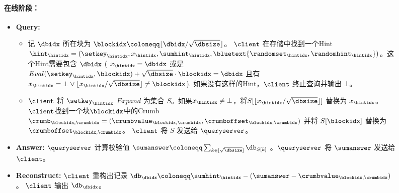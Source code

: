 \begin{figure*}
\begin{mdframed}
        \paragraph{在线阶段：}
        \begin{itemize}
            \item \textbf{Query:}
                  \begin{itemize}
                      \item 记 $\dbidx$ 所在块为 $\blockidx\coloneqq \lfloor \dbidx/\sqrt{\dbsize}\rfloor$。  $\client$ 在存储中找到一个Hint $\hint_\hintidx = (\setkey_\hintidx,x_\hintidx,\sumhint_\hintidx,\bluetext{\randomset_\hintidx,\randomhint_\hintidx})$。这个Hint需要包含 $\dbidx$ ( $x_\hintidx=\dbidx$ 或是 $Eval(\setkey_\hintidx, \blockidx) + \sqrt{\dbsize}\cdot \blockidx = \dbidx $ 且有 $x_\hintidx = \bot \vee \lfloor x_\hintidx/\sqrt{\dbsize}\rfloor\neq \blockidx$). 如果没有这样的Hint，$\client$ 终止查询并输出 $\bot$。
                      \item $\client$ 将 $\setkey_\hintidx$ $Expand$ 为集合 $S$。如果$x_\hintidx\neq \bot$，将$S[\lfloor x_\hintidx/\sqrt{\dbsize}\rfloor]$ 替换为 $x_\hintidx$。$\client$找到一个块$\blockidx$中的Crumb $\crumb_{\blockidx, \crumbidx}=(\crumbvalue_{\blockidx, \crumbidx},\crumboffset_{\blockidx, \crumbidx})$ 并将 $S[\blockidx]$ 替换为  $\crumboffset_{\blockidx, \crumbidx}$。  $\client$ 将 $S$  发送给 $\queryserver$。
                  \end{itemize}
            \item \textbf{Answer:} $\queryserver$ 计算校验值 $\sumanswer\coloneqq \sum_{k\in [\sqrt{\dbsize}]}\db_{S[k]}$ 。$\queryserver$ 将 $\sumanswer$  发送给 $\client$。
            \item \textbf{Reconstruct:} $\client$ 重构出记录 $\db_\dbidx \coloneqq  \sumhint_\hintidx-(\sumanswer-\crumbvalue_{\blockidx, \crumbidx})$。  $\client$ 输出 $\db_\dbidx$。

\end{itemize}
\end{mdframed}
\end{figure*}

